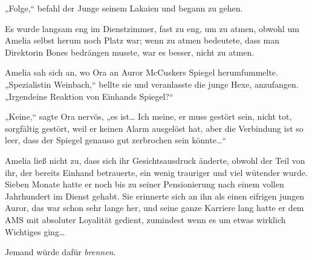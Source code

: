 „Folge,“ befahl der Junge seinem Lakaien und begann zu gehen.

\later

Es wurde langsam eng im Dienstzimmer, fast zu eng, um zu atmen, obwohl um Amelia selbst herum noch Platz war; wenn zu atmen bedeutete, dass man Direktorin Bones bedrängen musste, war es besser, nicht zu atmen.

Amelia sah sich an, wo Ora an Auror McCuskers Spiegel herumfummelte. „Spezialistin Weinbach,“ bellte sie und veranlasste die junge Hexe, anzufangen. „Irgendeine Reaktion von Einhands Spiegel?“

„Keine,“ sagte Ora nervös, „es ist… Ich meine, er muss gestört sein, nicht tot, sorgfältig gestört, weil er keinen Alarm ausgelöst hat, aber die Verbindung ist so leer, dass der Spiegel genauso gut zerbrochen sein könnte…“

Amelia ließ nicht zu, dass sich ihr Gesichtsausdruck änderte, obwohl der Teil von ihr, der bereits Einhand betrauerte, ein wenig trauriger und viel wütender wurde. Sieben Monate hatte er noch bis zu seiner Pensionierung nach einem vollen Jahrhundert im Dienst gehabt. Sie erinnerte sich an ihn als einen eifrigen jungen Auror, das war schon sehr lange her, und seine ganze Karriere lang hatte er dem AMS mit absoluter Loyalität gedient, zumindest wenn es um etwas wirklich Wichtiges ging…

Jemand würde dafür \emph{brennen}.

